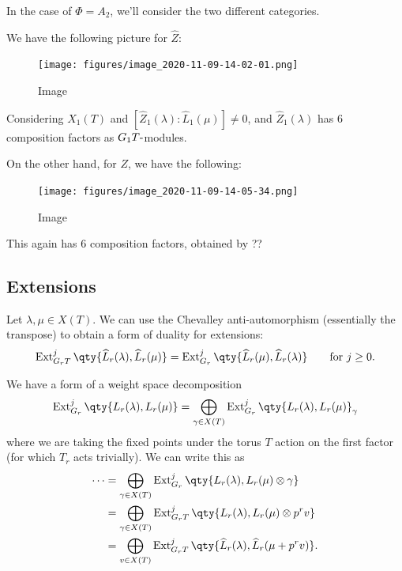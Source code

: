\begin{example}[?]

In the case of \(\Phi = A_2\), we'll consider the two different
categories.

We have the following picture for \(\widehat{Z}\):

\begin{figure}
\centering
\texttt{[image: figures/image\_2020-11-09-14-02-01.png]}
\caption{Image}
\end{figure}

Considering \(X_1(T)\) and
\([\widehat{Z}_1(\lambda) : \widehat{L}_1(\mu)] \neq 0\), and
\(\widehat{Z}_1(\lambda)\) has 6 composition factors as
\(G_1T{\hbox{-}}\)modules.

On the other hand, for \(Z\), we have the following:

\begin{figure}
\centering
\texttt{[image: figures/image\_2020-11-09-14-05-34.png]}
\caption{Image}
\end{figure}

This again has 6 composition factors, obtained by ??


\end{example}

\hypertarget{extensions}{%
\subsection{Extensions}\label{extensions}}

Let \(\lambda, \mu \in X(T)\). We can use the Chevalley
anti-automorphism (essentially the transpose) to obtain a form of
duality for extensions:
\begin{align*}  
\operatorname{Ext}_{G_r T}^j \qty{ \widehat{L}_r(\lambda), \widehat{L}_r(\mu) } 
= 
\operatorname{Ext}_{G_r}^j \qty{ \widehat{L}_r(\mu), \widehat{L}_r(\lambda) } \qquad \text{for }j\geq 0
.\end{align*}

We have a form of a weight space decomposition
\begin{align*}  
\operatorname{Ext}_{G_r}^j \qty{L_r(\lambda), L_r(\mu) }
= \bigoplus_{\gamma \in X(T)} \operatorname{Ext}_{G_r}^j \qty{L_r(\lambda), L_r(\mu) }_{\gamma}
\end{align*}
where we are taking the fixed points under the torus \(T\) action on the
first factor (for which \(T_r\) acts trivially). We can write this as
\begin{align*}  
\cdots 
&= \bigoplus_{\gamma \in X(T)} \operatorname{Ext}_{G_r}^j \qty{L_r(\lambda), L_r(\mu) \otimes\gamma } \\
&= \bigoplus_{\gamma \in X(T)} \operatorname{Ext}_{G_rT}^j \qty{L_r(\lambda), L_r(\mu) \otimes p^r v } \\
&= \bigoplus_{v \in X(T)} \operatorname{Ext}_{G_rT}^j \qty{ \widehat{L}_r(\lambda), \widehat{L}_r(\mu + p^r v) }
.\end{align*}


